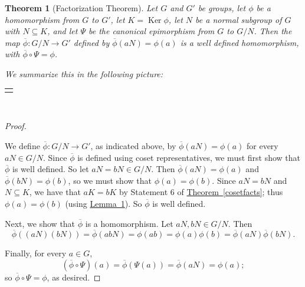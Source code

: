 \documentclass[10pt,openany,oneside]{book}
\theoremstyle{plain}
\newtheorem{theorem}{Theorem}[section]
\theoremstyle{definition}
\theoremstyle{definition}
\theoremstyle{definition}
\theoremstyle{definition}
\numberwithin{equation}{section}
\newlength{\panelmax}
\def\phibar{\overline{\phi}}
\DeclareMathOperator{\Ker}{Ker}
\begin{document}
\begin{theorem}[{Factorization Theorem}]\label{facthm}
Let \(G\) and \(G'\) be groups, let \(\phi\) be a homomorphism from \(G\) to \(G'\), let \(K=\Ker \phi\), let \(N\) be a normal subgroup of \(G\) with \(N\subseteq K\), and let \(\Psi\) be the canonical epimorphism from \(G\) to \(G/N\). Then the map \(\phibar: G/N \to G'\) defined by \(\phibar(aN)=\phi(a)\) is a well defined homomorphism, with \(\phibar \circ \Psi=\phi\).%
\par
We  summarize this in the following picture:%
{%
\setlength{\panelmax}{0pt}
\newsavebox{\panelboxGimage}
\begin{lrbox}{\panelboxGimage}
\resizebox{0.3\linewidth}{!}{{
\xymatrix{G\ar[rr]^{\phi}\ar[dr]_{\Psi}&&G'\\&G/N\ar@{.>}[ur]_{\phibar}&}
}
}\end{lrbox}
\newlength{\phGimage}\setlength{\phGimage}{\ht\panelboxGimage+\dp\panelboxGimage}
\settototalheight{\phGimage}{\usebox{\panelboxGimage}}
\setlength{\panelmax}{\maxof{\panelmax}{\phGimage}}
\leavevmode%
\setlength{\tabcolsep}{0\linewidth}
\par\medskip\noindent
\hspace*{0.35\linewidth}%
\begin{tabular}{@{}*{1}{c}@{}}
\begin{minipage}[c][\panelmax][t]{0.3\linewidth}\usebox{\panelboxGimage}\end{minipage}\end{tabular}\\
}%
\end{theorem}
\begin{proof}\hypertarget{proof-49}{}
We define \(\phibar: G/N\to G'\), as indicated above, by \(\phibar(aN)=\phi(a)\) for every \(aN\in G/N\). Since \(\phibar\) is defined using coset representatives, we must first show that \(\phibar\) is well defined. So let \(aN=bN\in G/N\). Then \(\phibar(aN)=\phi(a)\) and \(\phibar(bN)=\phi(b)\), so we must show that \(\phi(a)=\phi(b)\). Since \(aN=bN\) and \(N\subseteq K\), we have that \(aK=bK\) by Statement 6 of \hyperref[cosetfacts]{Theorem~\ref{cosetfacts}}; thus \(\phi(a)=\phi(b)\) (using \hyperref[kermean]{Lemma~1}). So \(\phibar\) is well defined.%
\par
Next, we show that \(\phibar\) is a homomorphism. Let \(aN,bN\in
G/N\). Then%
\begin{equation*}
\phibar((aN)(bN))=\phibar(abN)=\phi(ab)=\phi(a)\phi(b)=\phibar(aN)\phibar(bN).
\end{equation*}
%
\par
Finally, for every \(a\in G\),%
\begin{equation*}
(\phibar \circ
\Psi)(a)=\phibar(\Psi(a))=\phibar(aN)=\phi(a);
\end{equation*}
so \(\phibar \circ
\Psi = \phi\), as desired.%
\end{proof}
\end{document}
